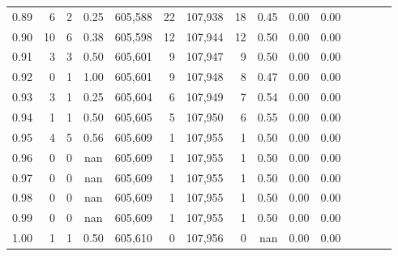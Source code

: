 \begin{tabular}{rrrcrrrrrrrrrrr}
0.89 &       6 &      2 &                                       0.25 &  605,588 &       22 &  107,938 &       18 &  0.45 &  0.00 &                         0.00 \\
0.90 &      10 &      6 &                                       0.38 &  605,598 &       12 &  107,944 &       12 &  0.50 &  0.00 &                         0.00 \\
0.91 &       3 &      3 &                                       0.50 &  605,601 &        9 &  107,947 &        9 &  0.50 &  0.00 &                         0.00 \\
0.92 &       0 &      1 &                                       1.00 &  605,601 &        9 &  107,948 &        8 &  0.47 &  0.00 &                         0.00 \\
0.93 &       3 &      1 &                                       0.25 &  605,604 &        6 &  107,949 &        7 &  0.54 &  0.00 &                         0.00 \\
0.94 &       1 &      1 &                                       0.50 &  605,605 &        5 &  107,950 &        6 &  0.55 &  0.00 &                         0.00 \\
0.95 &       4 &      5 &                                       0.56 &  605,609 &        1 &  107,955 &        1 &  0.50 &  0.00 &                         0.00 \\
0.96 &       0 &      0 &                                        nan &  605,609 &        1 &  107,955 &        1 &  0.50 &  0.00 &                         0.00 \\
0.97 &       0 &      0 &                                        nan &  605,609 &        1 &  107,955 &        1 &  0.50 &  0.00 &                         0.00 \\
0.98 &       0 &      0 &                                        nan &  605,609 &        1 &  107,955 &        1 &  0.50 &  0.00 &                         0.00 \\
0.99 &       0 &      0 &                                        nan &  605,609 &        1 &  107,955 &        1 &  0.50 &  0.00 &                         0.00 \\
1.00 &       1 &      1 &                                       0.50 &  605,610 &        0 &  107,956 &        0 &   nan &  0.00 &                         0.00 \\
\bottomrule
\end{tabular}
